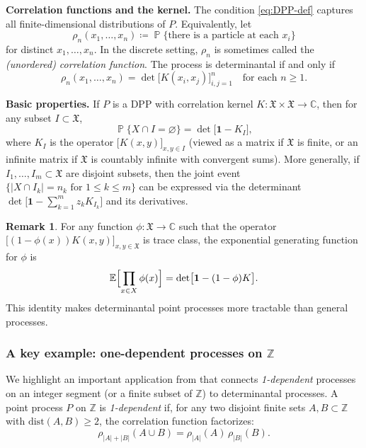 \documentclass[letterpaper,11pt,oneside,reqno]{article}
\numberwithin{equation}{section}
\theoremstyle{definition}
\newtheorem{remark}[proposition]{Remark}
\begin{document}
\noindent\textbf{Correlation functions and the kernel.}
The condition \eqref{eq:DPP-def} captures all finite-dimensional distributions of \(P\).
Equivalently, let
\[
	\rho_n(x_1,\dots,x_n) \coloneqq \operatorname{\mathbb{P}}\{\text{there is a particle at each }x_i\}
\]
for distinct \(x_1,\dots,x_n\). In the discrete setting, \(\rho_n\) is
sometimes called the \emph{(unordered) correlation function}. The process is
determinantal if and only if
\[
\rho_n(x_1,\dots,x_n) = \det\bigl[K(x_i,x_j)\bigr]_{i,j=1}^n
\quad
\text{for each }n\ge1.
\]

\noindent\textbf{Basic properties.} If \(P\) is a DPP with correlation kernel
\(K\colon \mathfrak{X}\times\mathfrak{X}\to\mathbb{C}\), then for any subset \(I\subset \mathfrak{X}\),
\begin{equation}
\label{eq:prob-empty-set-DPP}
\operatorname{\mathbb{P}}\{X\cap I = \varnothing\} = \det\bigl[\mathbf{1} - K_I\bigr],
\end{equation}
where \(K_I\) is the operator \(\bigl[K(x,y)\bigr]_{x,y\in I}\)
(viewed as a matrix if \(\mathfrak{X}\) is finite, or an infinite matrix if \(\mathfrak{X}\) is
countably infinite with convergent sums). More generally, if \(I_1,\dots,I_m\subset \mathfrak{X}\)
are disjoint subsets, then the joint event \(\{|X\cap I_k|=n_k\text{ for }1\le k\le m\}\)
can be expressed via the determinant
\(\det\bigl[\mathbf{1}-\sum_{k=1}^m z_k K_{I_k}\bigr]\)
and its derivatives.

\begin{remark}
For any function \(\phi:\mathfrak{X}\to\mathbb{C}\) such that the operator
\(\bigl[(1-\phi(x))K(x,y)\bigr]_{x,y\in\mathfrak{X}}\) is trace class, the
exponential generating function for \(\phi\) is
\[
\mathbb{E}\Bigl[\prod_{x\in X}\phi(x)\Bigr] = \det\bigl[\mathbf{1} - (1-\phi)K\bigr].
\]
This identity makes determinantal point processes more tractable than general processes.
\end{remark}

\subsubsection*{A key example: one-dependent processes on \texorpdfstring{$\mathbb{Z}$}{}}
We highlight an important application from \cite{borodin2010adding} that connects
\emph{1-dependent} processes on an integer segment (or a finite subset of \(\mathbb{Z}\))
to determinantal processes. A point process \(P\) on \(\mathbb{Z}\) is \emph{1-dependent} if,
for any two disjoint finite sets \(A,B\subset\mathbb{Z}\) with \(\mathrm{dist}(A,B)\ge2\),
the correlation function factorizes:
\[
\rho_{|A|+|B|}(A\cup B) = \rho_{|A|}(A)\,\rho_{|B|}(B).
\]
\end{document}
